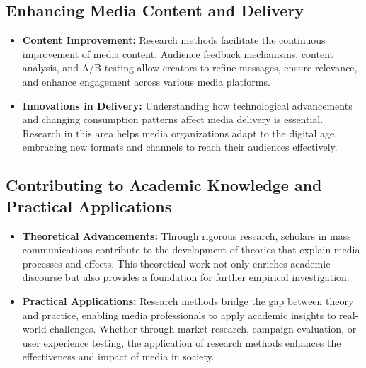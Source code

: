 \documentclass[
]{book}
\providecommand{\tightlist}{%
  \setlength{\itemsep}{0pt}\setlength{\parskip}{0pt}}
\begin{document}
\hypertarget{enhancing-media-content-and-delivery}{%
\subsection*{Enhancing Media Content and Delivery}\label{enhancing-media-content-and-delivery}}

\begin{itemize}
\tightlist
\item
  \textbf{Content Improvement:} Research methods facilitate the continuous improvement of media content. Audience feedback mechanisms, content analysis, and A/B testing allow creators to refine messages, ensure relevance, and enhance engagement across various media platforms.
\item
  \textbf{Innovations in Delivery:} Understanding how technological advancements and changing consumption patterns affect media delivery is essential. Research in this area helps media organizations adapt to the digital age, embracing new formats and channels to reach their audiences effectively.
\end{itemize}

\hypertarget{contributing-to-academic-knowledge-and-practical-applications}{%
\subsection*{Contributing to Academic Knowledge and Practical Applications}\label{contributing-to-academic-knowledge-and-practical-applications}}

\begin{itemize}
\tightlist
\item
  \textbf{Theoretical Advancements:} Through rigorous research, scholars in mass communications contribute to the development of theories that explain media processes and effects. This theoretical work not only enriches academic discourse but also provides a foundation for further empirical investigation.
\item
  \textbf{Practical Applications:} Research methods bridge the gap between theory and practice, enabling media professionals to apply academic insights to real-world challenges. Whether through market research, campaign evaluation, or user experience testing, the application of research methods enhances the effectiveness and impact of media in society.
\end{itemize}
\end{document}
